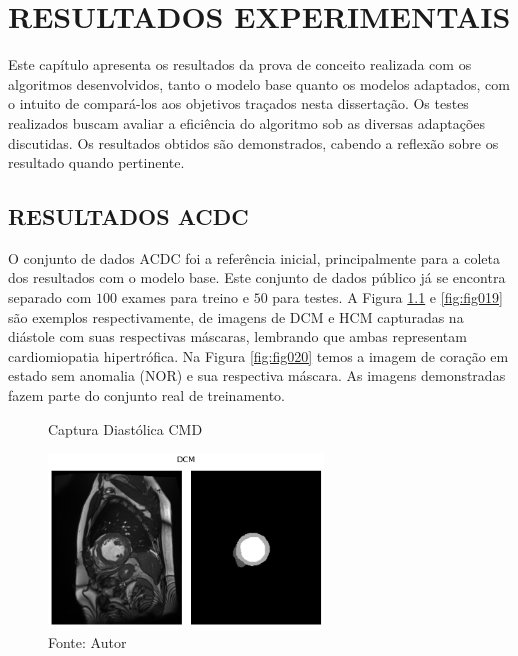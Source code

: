 \chapter{RESULTADOS EXPERIMENTAIS}
\label{chap:resultados_experimentais}

Este capítulo apresenta os resultados da prova de conceito realizada com os algoritmos desenvolvidos, tanto o modelo base quanto os modelos adaptados, com o intuito de compará-los aos objetivos traçados nesta dissertação. Os testes realizados buscam avaliar a eficiência do algoritmo sob as diversas adaptações discutidas. Os resultados obtidos são demonstrados, cabendo a reflexão sobre os resultado quando pertinente.

\section{RESULTADOS ACDC}
\label{sec:resultados_acdc}

O conjunto de dados \gls{ACDC} foi a referência inicial, principalmente para a coleta dos resultados com o modelo base. Este conjunto de dados público já se encontra separado com $100$ exames para treino e $50$ para testes. A Figura \ref{fig:fig018} e \ref{fig:fig019} são exemplos respectivamente, de imagens de \gls{DCM} e \gls{HCM} capturadas na diástole com suas respectivas máscaras, lembrando que ambas representam cardiomiopatia hipertrófica. Na Figura \ref{fig:fig020} temos a imagem de coração em estado sem anomalia (\gls{NOR}) e sua respectiva máscara. As imagens demonstradas fazem parte do conjunto real de treinamento.

\begin{figure}[h!]
    \centering
    \caption{Captura Diastólica CMD}
    \includegraphics[width=0.65\textwidth]{figures/fig018.png}
    \caption*{Fonte: Autor}
    \label{fig:fig018}
\end{figure}

